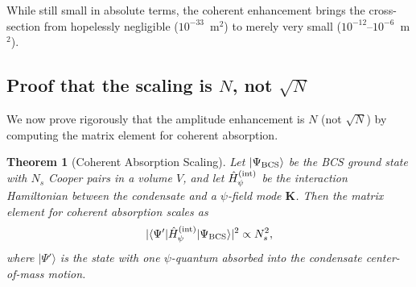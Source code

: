 \documentclass[12pt,aps,prd,twocolumn,superscriptaddress,nofootinbib]{revtex4-2}
\newtheorem{theorem}{Theorem}
\begin{document}
While still small in absolute terms, the coherent enhancement brings
the cross-section from hopelessly negligible ($10^{-33}$~m$^2$) to
merely very small ($10^{-12}$--$10^{-6}$~m$^2$).

\subsection{Proof that the scaling is $N$, not $\sqrt{N}$}
\label{sec:N-scaling-proof}

We now prove rigorously that the amplitude enhancement is $N$ (not
$\sqrt{N}$) by computing the matrix element for coherent absorption.

\begin{theorem}[Coherent Absorption Scaling]
\label{thm:N-scaling}
Let $|\Psi_{\rm BCS}\rangle$ be the BCS ground state with $N_s$
Cooper pairs in a volume $V$, and let $\hat{H}_\psi^{(\rm int)}$
be the interaction Hamiltonian between the condensate and a $\psi$-field
mode $\mathbf{K}$. Then the matrix element for coherent absorption
scales as
\begin{equation}
|\langle\Psi'|\hat{H}_\psi^{(\rm int)}|\Psi_{\rm BCS}\rangle|^2
\propto N_s^2,
\end{equation}
where $|\Psi'\rangle$ is the state with one $\psi$-quantum absorbed
into the condensate center-of-mass motion.
\end{theorem}
\end{document}
